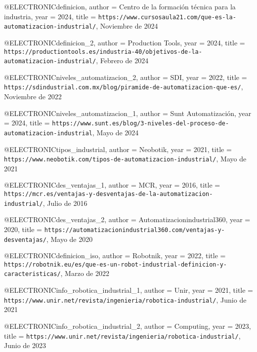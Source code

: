 @ELECTRONIC{definicion,
  author = {{Centro de la formación técnica para la industria}},
  year = {2024},
  title = {\texttt{https://www.cursosaula21.com/que-es-la-automatizacion-industrial/}, {N}oviembre de 2024}
}

@ELECTRONIC{definicion_2,
  author = {{Production Tools}},
  year = {2024},
  title = {\texttt{https://productiontools.es/industria-40/objetivos-de-la-automatizacion-industrial/}, {F}ebrero de 2024}
}

@ELECTRONIC{niveles_automatizacion_2,
  author = {{SDI}},
  year = {2022},
  title = {\texttt{https://sdindustrial.com.mx/blog/piramide-de-automatizacion-que-es/}, {N}oviembre de 2022}
}

@ELECTRONIC{niveles_automatizacion_1,
  author = {{Sunt Automatización}},
  year = {2024},
  title = {\texttt{https://www.sunt.es/blog/3-niveles-del-proceso-de-automatizacion-industrial}, {M}ayo de 2024}
}

@ELECTRONIC{tipos_industrial,
  author = {{Neobotik}},
  year = {2021},
  title = {\texttt{https://www.neobotik.com/tipos-de-automatizacion-industrial/}, {M}ayo de 2021}
}

@ELECTRONIC{des_ventajas_1,
  author = {{MCR}},
  year = {2016},
  title = {\texttt{https://mcr.es/ventajas-y-desventajas-de-la-automatizacion-industrial/}, {J}ulio de 2016}
}

@ELECTRONIC{des_ventajas_2,
  author = {{Automatizacionindustrial360}},
  year = {2020},
  title = {\texttt{https://automatizacionindustrial360.com/ventajas-y-desventajas/}, {M}ayo de 2020}
}

@ELECTRONIC{definicion_iso,
  author = {{Robotnik}},
  year = {2022},
  title = {\texttt{https://robotnik.eu/es/que-es-un-robot-industrial-definicion-y-caracteristicas/}, {M}arzo de 2022}
}

@ELECTRONIC{info_robotica_industrial_1,
  author = {{Unir}},
  year = {2021},
  title = {\texttt{https://www.unir.net/revista/ingenieria/robotica-industrial/}, {J}unio de 2021}
}

@ELECTRONIC{info_robotica_industrial_2,
  author = {{Computing}},
  year = {2023},
  title = {\texttt{https://www.unir.net/revista/ingenieria/robotica-industrial/}, {J}unio de 2023}
}

